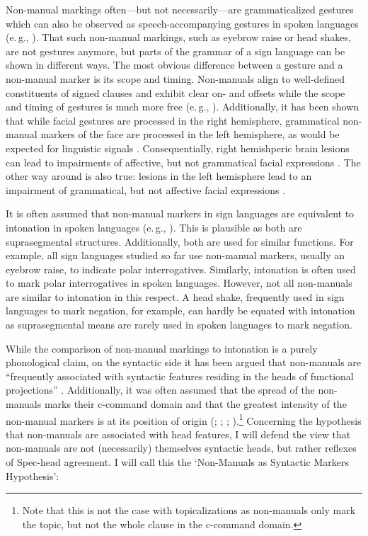 Non-manual markings often---but not necessarily---are grammaticalized gestures which can also be observed as speech-accompanying gestures in spoken languages (e.\,g., \citealt{wilcox2004gesture, pfau2006modality, pfau2011grammaticalization}). That such non-manual markings, such as eyebrow raise or head shakes, are not gestures anymore, but parts of the grammar of a sign language can be shown in different ways. The most obvious difference between a gesture and a non-manual marker is its scope and timing. Non-manuals align to well-defined constituents of signed clauses and exhibit clear on- and offsets while the scope and timing of gestures is much more free (e.\,g., \citealt{bakershenk1983, emmorey1999signers, wilbur2003modality}). Additionally, it has been shown that while facial gestures are processed in the right hemisphere, grammatical non-manual markers of the face are processed in the left hemisphere, as would be expected for linguistic signals \citep{corina1989recognition}. Consequentially, right hemishperic brain lesions can lead to impairments of affective, but not grammatical facial expressions \citep{kegl1991interplay, poizner1992neural, loew1997fractionation, corina1999neuropsychological}. The other way around is also true: lesions in the left hemisphere lead to an impairment of grammatical, but not affective facial expressions \citep{kegl1997crosslinguistic}.

It is often assumed that non-manual markers in sign languages are equivalent to intonation in spoken languages (e.\,g., \citealt{sandler1999prosody}). This is plausible as both are suprasegmental structures. Additionally, both are used for similar functions. For example, all sign languages studied so far use non-manual markers, usually an eyebrow raise, to indicate polar interrogatives. Similarly, intonation is often used to mark polar interrogatives in spoken languages. However, not all non-manuals are similar to intonation in this respect. A head shake, frequently used in sign languages to mark negation, for example, can hardly be equated with intonation as suprasegmental means are rarely used in spoken languages to mark negation.

While the comparison of non-manual markings to intonation is a purely phonological claim, on the syntactic side it has been argued that non-manuals are ``frequently associated with syntactic features residing in the heads of functional projections'' \citep[43]{neidle2000syntax}. Additionally, it was often assumed that the spread of the non-manuals marks their c-command domain and that the greatest intensity of the non-manual markers is at its position of origin (\citealt{bahan1996}; \citealt{petronio1997}; \citealt[43--45]{neidle2000syntax}; \citealt[311--312]{sandler2006sign}).\footnote{ Note that this is not the case with topicalizations as non-manuals only mark the topic, but not the whole clause in the c-command domain.} Concerning the hypothesis that non-manuals are associated with head features, I will defend the view that non-manuals are not (necessarily) themselves syntactic heads, but rather reflexes of Spec-head agreement. I will call this the `Non-Manuals as Syntactic Markers Hypothesis':


